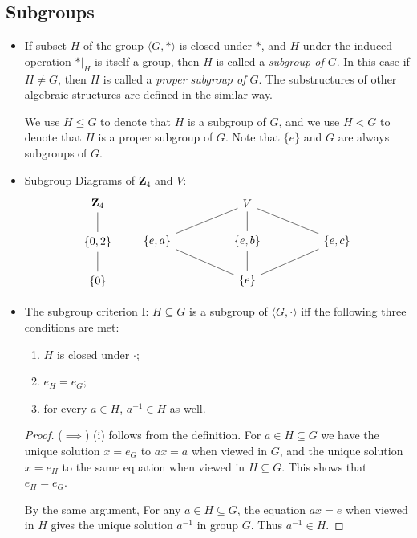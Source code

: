 \documentclass[11pt]{article}
\newcommand{\Z}{\mathbf{Z}}
\newcommand{\df}[1]{\textit{\textsf{#1}}}
\newcommand{\la}{\langle}
\newcommand{\ra}{\rangle}
\begin{document}
\subsection{Subgroups}
\begin{itemize}
    \item If subset $H$ of the group $\la G,\ast \ra$ is closed under $\ast$, and $H$ under the induced operation $\ast|_H$ is itself a group, then $H$ is called a \df{subgroup of $G$}. In this case if $H \neq G$, then $H$ is called a \df{proper subgroup of $G$}. The substructures of other algebraic structures are defined in the similar way.

    We use $H \leq G$ to denote that $H$ is a subgroup of $G$, and we use $H < G$ to denote that $H$ is a proper subgroup of $G$. Note that $\{e\}$ and $G$ are always subgroups of $G$.
    \item Subgroup Diagrams of $\Z_4$ and $V$:
    \[\begin{tikzcd}
\Z_4 \arrow[d, no head] \\
{\{0,2\}} \arrow[d, no head] \\
\{0\}                          
\end{tikzcd} \qquad \begin{tikzcd}
&  & V \arrow[d, no head] \arrow[lld, no head] \arrow[rrd, no head] &  &\\
{\{e,a\}} \arrow[rrd, no head] &  & {\{e,b\}} \arrow[d, no head] &  & {\{e,c\}} \arrow[lld, no head] \\ &  & \{e\} &  &
\end{tikzcd}\]
    \item The subgroup criterion I: $H \subseteq G$ is a subgroup of $\la G,\cdot \ra$ iff the following three conditions are met:
    \begin{enumerate}[label=(\roman*)]
        \item $H$ is closed under $\cdot$;
        \item $e_H = e_G$;
        \item for every $a \in H$, $a^{-1} \in H$ as well.
    \end{enumerate}
    \begin{proof}
        ($\implies$) (i) follows from the definition. For $a \in H \subseteq G$ we have the unique solution $x = e_G$ to $ax = a$ when viewed in $G$, and the unique solution $x = e_H$ to the same equation when viewed in $H \subseteq G$. This shows that $e_H = e_G$.

        By the same argument, For any $a \in H \subseteq G$, the equation $ax = e$ when viewed in $H$ gives the unique solution $a^{-1}$ in group $G$. Thus $a^{-1} \in H$.


\end{proof}
\end{itemize}
\end{document}
